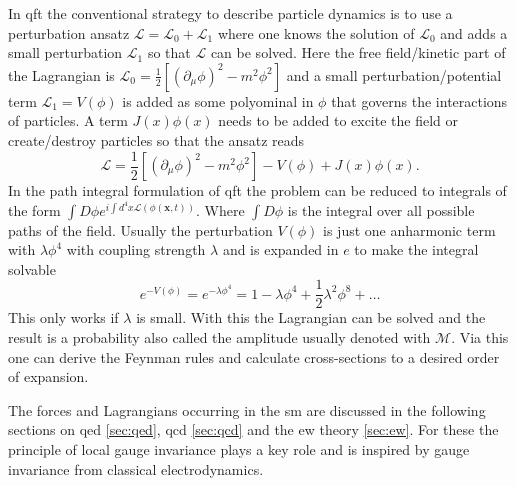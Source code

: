 In \ac{qft} the conventional strategy to describe particle dynamics is to use a perturbation ansatz $\mathcal{L}=\mathcal{L}_0+\mathcal{L}_1$ where one knows the solution of $\mathcal{L}_0$ and adds a small perturbation $\mathcal{L}_1$ so that $\mathcal{L}$ can be solved. Here the free field/kinetic part of the Lagrangian is \mbox{$\mathcal{L}_0=\frac{1}{2}[(\partial_\mu \phi)^2 - m^2\phi^2] $} and a small perturbation/potential term $\mathcal{L}_1=V(\phi)$ is added as some polyominal in $\phi$ that governs the interactions of particles. A term $J(x)\phi(x)$ needs to be added to excite the field or create/destroy particles so that the ansatz reads
\begin{equation}
    \mathcal{L}=\frac{1}{2}[(\partial_\mu \phi)^2 - m^2\phi^2]
    -V(\phi) + J(x)\phi(x).
\end{equation}
In the path integral formulation of \ac{qft} the problem can be reduced to integrals of the form \mbox{$\int D\phi e^{i\int d^4x \mathcal{L}(\phi(\bm{x},t))}$}. Where $\int D\phi$ is the integral over all possible paths of the field. Usually the perturbation $V(\phi)$ is just one anharmonic term with $\lambda\phi^4$ with coupling strength $\lambda$ and is expanded in $e$ to make the integral solvable
\begin{equation}
    e^{-V(\phi)}=e^{-\lambda\phi^4}=1-\lambda\phi^4+\frac{1}{2}\lambda^2\phi^8+\dots
\end{equation}
This only works if $\lambda$ is small. With this the Lagrangian can be solved and the result is a probability also called the amplitude usually denoted with $\mathcal{M}$. Via this one can derive the Feynman rules and calculate cross-sections to a desired order of expansion.

The forces and Lagrangians occurring in the \ac{sm} are discussed in the following sections on \ac{qed} \ref{sec:qed}, \ac{qcd} \ref{sec:qcd} and the \ac{ew} theory \ref{sec:ew}. For these the principle of local gauge invariance plays a key role and is inspired by gauge invariance from classical electrodynamics.

